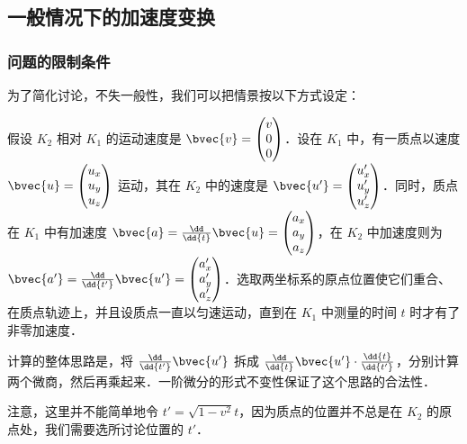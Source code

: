 


\subsection{一般情况下的加速度变换}
\subsubsection{问题的限制条件}

为了简化讨论，不失一般性，我们可以把情景按以下方式设定：

假设 $K_2$ 相对 $K_1$ 的运动速度是 $\bvec{v}=\left(\begin{matrix}v\\0\\0\end{matrix} \right) $．设在 $K_1$ 中，有一质点以速度 $\bvec{u}=\left(\begin{matrix}u_x\\u_y\\u_z\end{matrix} \right)$ 运动，其在 $K_2$ 中的速度是 $\bvec{u'}=\left(\begin{matrix}u_x'\\u_y'\\u_z'\end{matrix} \right) $．同时，质点在 $K_1$ 中有加速度 $\bvec{a}=\frac{\dd}{\dd{t}}\bvec{u}=\left(\begin{matrix}a_x\\a_y\\a_z\end{matrix} \right)$，在 $K_2$ 中加速度则为 $\bvec{a'}=\frac{\dd}{\dd{t'}}\bvec{u'}=\left(\begin{matrix}a_x'\\a_y'\\a_z'\end{matrix} \right)$．选取两坐标系的原点位置使它们重合、在质点轨迹上，并且设质点一直以匀速运动，直到在 $K_1$ 中测量的时间 $t$ 时才有了非零加速度．

计算的整体思路是，将 $\frac{\dd}{\dd{t'}}\bvec{u'}$ 拆成 $\frac{\dd}{\dd{t}}\bvec{u'}\cdot\frac{\dd{t}}{\dd{t'}}$，分别计算两个微商，然后再乘起来．一阶微分的形式不变性保证了这个思路的合法性．

注意，这里并不能简单地令 $t'=\sqrt{1-v^2}t$，因为质点的位置并不总是在 $K_2$ 的原点处，我们需要选所讨论位置的 $t'$．

